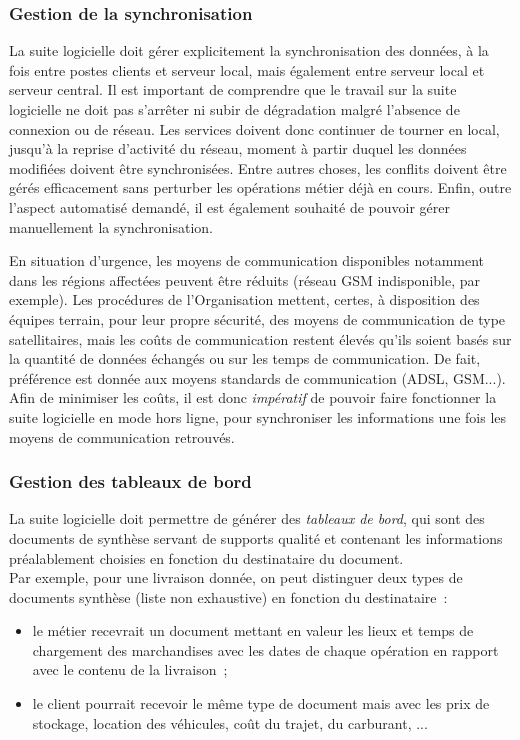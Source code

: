 \subsubsection{Gestion de la synchronisation}
La suite logicielle doit gérer explicitement la synchronisation des données, à la fois entre postes clients et serveur local, mais également entre serveur local et serveur central. Il est important de comprendre que le travail sur la suite logicielle ne doit pas s'arrêter ni subir de dégradation malgré l'absence de connexion ou de réseau. Les services doivent donc continuer de tourner en local, jusqu'à la reprise d'activité du réseau, moment à partir duquel les données modifiées doivent être synchronisées. Entre autres choses, les conflits doivent être gérés efficacement sans perturber les opérations métier déjà en cours. Enfin, outre l'aspect automatisé demandé, il est également souhaité de pouvoir gérer manuellement la synchronisation.
\begin{constraint}
En situation d'urgence, les moyens de communication disponibles notamment dans les régions affectées peuvent être \og{}réduits\fg{} (réseau GSM indisponible, par exemple). Les procédures de l'Organisation mettent, certes, à disposition des équipes terrain, pour leur propre sécurité, des moyens de communication de type satellitaires, mais les coûts de communication restent élevés qu'ils soient basés sur la quantité de données échangés ou sur les temps de communication. De fait, préférence est donnée aux moyens \og{}standards\fg{} de communication (ADSL, GSM...). Afin de minimiser les coûts, il est donc \emph{impératif} de pouvoir faire fonctionner la suite logicielle en mode \og{}hors ligne\fg{}, pour synchroniser les informations une fois les moyens de communication retrouvés.
\end{constraint}

\subsubsection{Gestion des tableaux de bord}
La suite logicielle doit permettre de générer des \emph{tableaux de bord}, qui sont des documents de synthèse servant de supports qualité et contenant les informations préalablement choisies en fonction du destinataire du document.
\\
Par exemple, pour une livraison donnée, on peut distinguer deux types de documents synthèse (liste non exhaustive) en fonction du destinataire~:
\begin{itemize}
\item le métier recevrait un document mettant en valeur les lieux et temps de chargement des marchandises avec les dates de chaque opération en rapport avec le contenu de la livraison~;
\item le client pourrait recevoir le même type de document mais avec les prix de stockage, location des véhicules, coût du trajet, du carburant, ...
\end{itemize}

